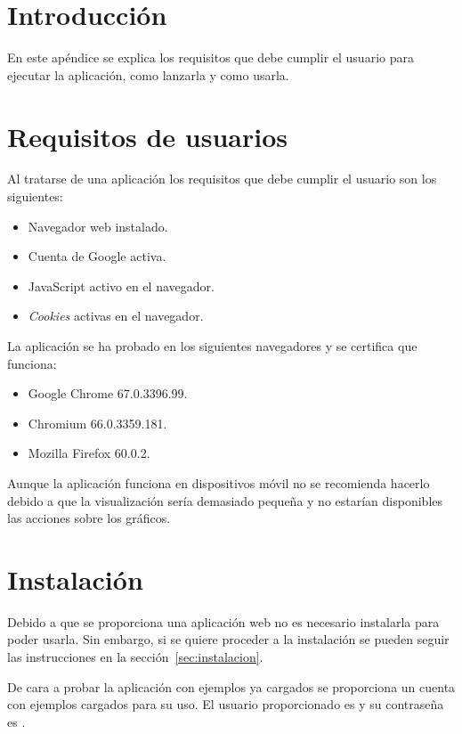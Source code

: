 
\section{Introducción}

En este apéndice se explica los requisitos que debe cumplir el usuario para 
ejecutar la aplicación, como lanzarla y como usarla.

\section{Requisitos de usuarios}

Al tratarse de una aplicación los requisitos que debe cumplir el usuario son 
los siguientes:
\begin{itemize}
	\tightlist
	\item Navegador web instalado.
	\item Cuenta de Google activa.
	\item JavaScript activo en el navegador.
	\item \textit{Cookies} activas en el navegador.
\end{itemize}

La aplicación se ha probado en los siguientes navegadores y se certifica que 
funciona:
\begin{itemize}
	\tightlist
	\item Google Chrome 67.0.3396.99.
	\item Chromium 66.0.3359.181.
	\item Mozilla Firefox 60.0.2.
\end{itemize}

Aunque la aplicación funciona en dispositivos móvil no se recomienda hacerlo 
debido a que la visualización sería demasiado pequeña y no estarían disponibles 
las acciones sobre los gráficos.

\section{Instalación}

Debido a que se proporciona una aplicación web no es necesario instalarla para 
poder usarla. Sin embargo, si se quiere proceder a la instalación se pueden 
seguir las instrucciones en la sección~\ref{sec:instalacion}.

De cara a probar la aplicación con ejemplos ya cargados se proporciona un 
cuenta con ejemplos cargados para su uso. El usuario proporcionado es  
 y su contraseña es 
.

